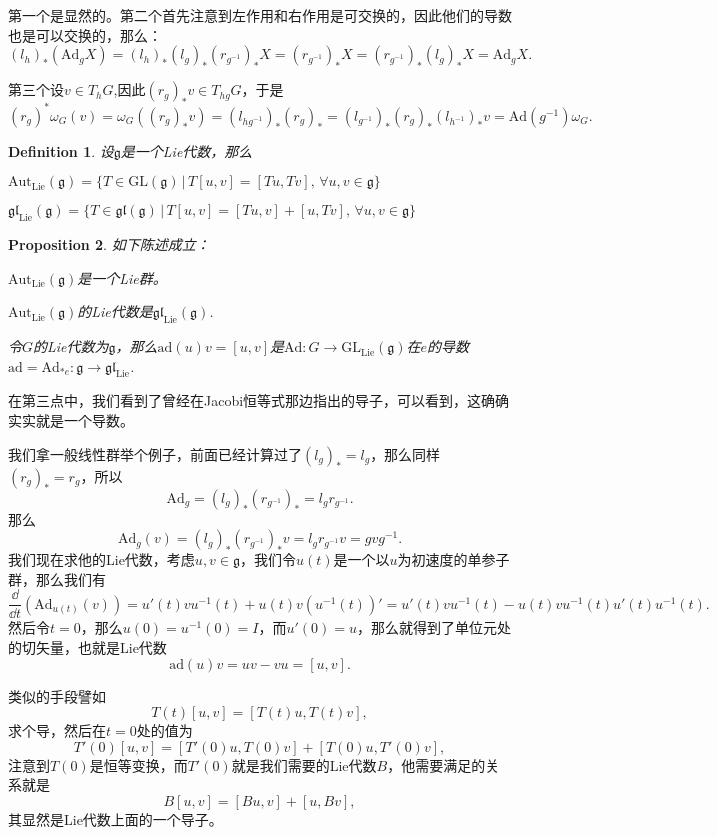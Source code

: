 \documentclass[9pt]{extbook}
\theoremstyle{plain}
\newtheorem{defi}{Definition}
\newtheorem{pro}[defi]{Proposition}
\newcommand{\lag}{{\mathfrak{g}}}  %
\newcommand{\ad}{{\mathrm{ad}}}
\begin{document}
第一个是显然的。第二个首先注意到左作用和右作用是可交换的，因此他们的导数也是可以交换的，那么：
\[
	(l_h)_*(\mathrm{Ad}_gX)=(l_h)_*(l_g)_*(r_{g^{-1}})_*X=(r_{g^{-1}})_*X=(r_{g^{-1}})_*(l_g)_*X=\mathrm{Ad}_gX.
\]

第三个设$v\in T_hG$,因此$(r_g)_*v\in T_{hg}G$，于是
\[
	(r_g)^*\omega_G(v)=\omega_G((r_g)_*v)=(l_{{hg}^{-1}})_*(r_g)_*
	=(l_{{g}^{-1}})_*(r_g)_*(l_{{h}^{-1}})_*v=\mathrm{Ad}(g^{-1})\omega_G.
\]

\begin{defi}
设$\lag$是一个Lie代数，那么

 $\mathrm{Aut}_{\mathrm{Lie}}(\lag)=\{T\in \mathrm{GL}(\lag)\,|\,T[u,v]=[Tu,Tv],\,\forall u,v\in\lag\}$

 $\mathfrak{gl}_{\mathrm{Lie}}(\lag)=\{T\in \mathfrak{gl}(\lag)\,|\,T[u,v]=[Tu,v]+[u,Tv],\,\forall u,v\in\lag\}$
\end{defi}

\begin{pro}如下陈述成立：

 $\mathrm{Aut}_{\mathrm{Lie}}(\lag)$是一个Lie群。

 $\mathrm{Aut}_{\mathrm{Lie}}(\lag)$的Lie代数是$\mathfrak{gl}_{\mathrm{Lie}}(\lag)$.

 令$G$的Lie代数为$\lag$，那么$\ad(u)v=[u,v]$是$\mathrm{Ad}:G\to \mathrm{GL}_{\mathrm{Lie}}(\lag)$在$e$的导数$\ad=\mathrm{Ad}_{*e}:\lag\to \mathfrak{gl}_{\mathrm{Lie}}$.
\end{pro}

在第三点中，我们看到了曾经在Jacobi恒等式那边指出的导子，可以看到，这确确实实就是一个导数。

我们拿一般线性群举个例子，前面已经计算过了$(l_g)_*=l_g$，那么同样$(r_g)_*=r_g$，所以
\[
	\mathrm{Ad}_g=(l_g)_*(r_{g^{-1}})_*=l_gr_{g^{-1}}.
\]
那么
\[
	\mathrm{Ad}_g(v)=(l_g)_*(r_{g^{-1}})_*v=l_gr_{g^{-1}}v=gvg^{-1}.
\]
我们现在求他的Lie代数，考虑$u,v\in \lag$，我们令$u(t)$是一个以$u$为初速度的单参子群，那么我们有
\[
\frac{\dd}{\dd t}(\mathrm{Ad}_{u(t)}(v))=u'(t)vu^{-1}(t)+u(t)v(u^{-1}(t))'=u'(t)vu^{-1}(t)-u(t)vu^{-1}(t)u'(t)u^{-1}(t).
\]
然后令$t=0$，那么$u(0)=u^{-1}(0)=I$，而$u'(0)=u$，那么就得到了单位元处的切矢量，也就是Lie代数
\[
\ad(u)v=uv-vu=[u,v].
\]

类似的手段譬如
\[
T(t)[u,v]=[T(t)u,T(t)v],
\]
求个导，然后在$t=0$处的值为
\[
T'(0)[u,v]=[T'(0)u,T(0)v]+[T(0)u,T'(0)v],
\]
注意到$T(0)$是恒等变换，而$T'(0)$就是我们需要的Lie代数$B$，他需要满足的关系就是
\[
B[u,v]=[Bu,v]+[u,Bv],
\]
其显然是Lie代数上面的一个导子。
\end{document}
